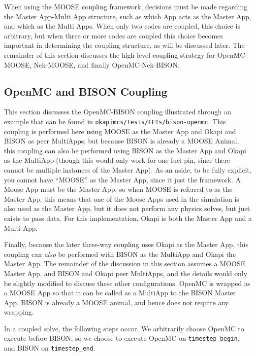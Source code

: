 \documentclass[10pt]{article}
\numberwithin{equation}{section} %
\begin{document}
When using the MOOSE coupling framework, decisions must be made regarding the Master App-Multi App structure, such as which App acts as the Master App, and which as the Multi Apps. When only two codes are coupled, this choice is arbitrary, but when three or more codes are coupled this choice becomes important in determining the coupling structure, as will be discussed later. The remainder of this section discusses the high-level coupling strategy for OpenMC-MOOSE, Nek-MOOSE, and finally OpenMC-Nek-BISON. 

\subsection{OpenMC and BISON Coupling}
This section discusses the OpenMC-BISON coupling illustrated through an example that can be found in {\tt okapimcs/tests/FETs/bison-openmc}. This coupling is performed here using MOOSE as the Master App and Okapi and BISON as peer MultiApps, but because BISON is already a MOOSE Animal, this coupling can also be performed using BISON as the Master App and Okapi as the MultiApp (though this would only work for one fuel pin, since there cannot be multiple instances of the Master App). As an aside, to be fully explicit, you cannot have ``MOOSE'' as the Master App, since it just the framework. A Moose App must be the Master App, so when MOOSE is referred to as the Master App, this means that one of the Moose Apps used in the simulation is also used as the Master App, but it does not perform any physics solves, but just exists to pass data. For this implementation, Okapi is both the Master App and a Multi App.

Finally, because the later three-way coupling uses Okapi as the Master App, this coupling can {\it also} be performed with BISON as the MultiApp and Okapi the Master App. The remainder of the discussion in this section assumes a MOOSE Master App, and BISON and Okapi peer MultiApps, and the details would only be slightly modified to discuss these other configurations. OpenMC is wrapped as a MOOSE App so that it can be called as a MultiApp to the BISON Master App. BISON is already a MOOSE animal, and hence does not require any wrapping.

In a coupled solve, the following steps occur. We arbitrarily choose OpenMC to execute before BISON, so we choose to execute OpenMC on {\tt timestep\_begin}, and BISON on {\tt timestep\_end}. 
\end{document}
